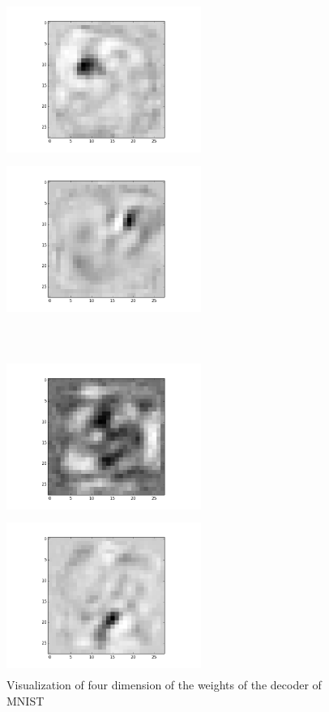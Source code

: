 \documentclass{article}
\begin{document}
\begin{figure}[htb]
\label{weights}
\centering
\begin{minipage}{0.36\textwidth}
\includegraphics[height=2in,width=2.5in]{w1.png}
\end{minipage}%
\centering
\begin{minipage}{0.36\textwidth}
\includegraphics[height=2in,width=2.5in]{w2.png}
\end{minipage}\\
\centering
\begin{minipage}{0.36\textwidth}
\includegraphics[height=2in,width=2.5in]{w3.png}
\end{minipage}%
\centering
\begin{minipage}{0.36\textwidth}
\includegraphics[height=2in,width=2.5in]{w4.png}
\end{minipage}
\caption{Visualization of four dimension of the weights of the decoder of MNIST}
\end{figure}
\end{document}
